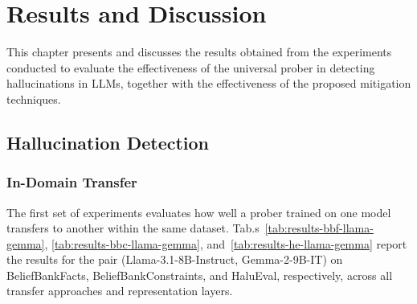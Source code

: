\chapter{Results and Discussion}

This chapter presents and discusses the results obtained from the experiments conducted to evaluate the effectiveness of the universal prober in detecting hallucinations in LLMs, together with the effectiveness of the proposed mitigation techniques.

\section{Hallucination Detection}

\subsection{In-Domain Transfer}

The first set of experiments evaluates how well a prober trained on one model transfers to another within the same dataset. Tab.s~\ref{tab:results-bbf-llama-gemma}, \ref{tab:results-bbc-llama-gemma}, and~\ref{tab:results-he-llama-gemma} report the results for the pair (Llama-3.1-8B-Instruct, Gemma-2-9B-IT) on BeliefBankFacts, BeliefBankConstraints, and HaluEval, respectively, across all transfer approaches and representation layers.

